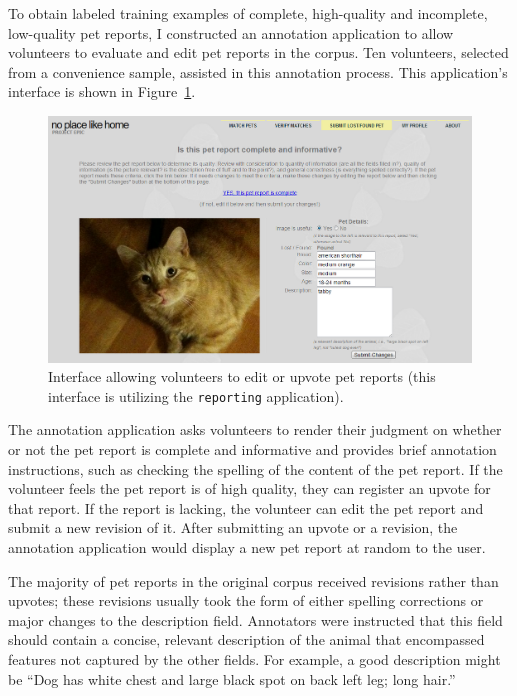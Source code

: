 To obtain labeled training examples of complete, high-quality and incomplete, low-quality pet reports, I constructed an annotation application to allow volunteers to evaluate and edit pet reports in the corpus.  Ten volunteers, selected from a convenience sample, assisted in this annotation process.  This application's interface is shown in Figure~\ref{fig:annotation1}.

\begin{figure}[htbp]
    \begin{center}
	\includegraphics[width=150mm]{figs/annotation1.png}
    \end{center}
        \caption[{\tt Pet} classifier Annotation Interface]{
        Interface allowing volunteers to edit or upvote pet reports (this interface is utilizing the {\tt reporting} application).  
	}
	 \label{fig:annotation1}
\end{figure}

The annotation application asks volunteers to render their judgment on whether or not the pet report is complete and informative and provides brief annotation instructions, such as checking the spelling of the content of the pet report.  If the volunteer feels the pet report is of high quality, they can register an upvote for that report.  If the report is lacking, the volunteer can edit the pet report and submit a new revision of it.  After submitting an upvote or a revision, the annotation application would display a new pet report at random to the user.

The majority of pet reports in the original corpus received revisions rather than upvotes; these revisions usually took the form of either spelling corrections or major changes to the description field.  Annotators were instructed that this field should contain a concise, relevant description of the animal that encompassed features not captured by the other fields.  For example, a good description might be ``Dog has white chest and large black spot on back left leg; long hair.''

